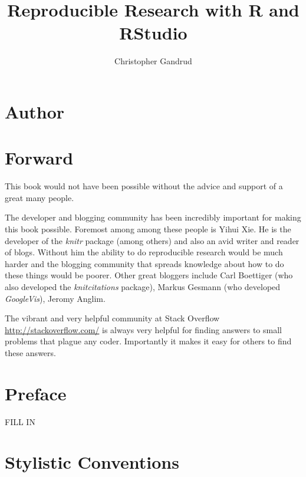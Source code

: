 \documentclass[ChapterTOCs,krantz1]{krantz}\usepackage{graphicx, color}
\begin{document}
\title{Reproducible Research with R and RStudio}

\author{Christopher Gandrud}

\maketitle

\frontmatter

{\chapter*{Author}}





\chapter*{Forward}

This book would not have been possible without the advice and support of a great many people.

The developer and blogging community has been incredibly important for making this book possible. Foremost among among these people is Yihui Xie. He is the developer of the {\emph{knitr}} package (among others) and also an avid writer and reader of blogs. Without him the ability to do reproducible research would be much harder and the blogging community that spreads knowledge about how to do these things would be poorer. Other great bloggers include Carl Boettiger (who also developed the {\emph{knitcitations}} package), Markus Gesmann (who developed {\emph{GoogleVis}}), Jeromy Anglim.

The vibrant and very helpful community at Stack Overflow \url{http://stackoverflow.com/} is always very helpful for finding answers to small problems that plague any coder. Importantly it makes it easy for others to find these answers.



\chapter*{Preface}

FILL IN


\chapter*{Stylistic Conventions}\label{StylisticConventions}
\begin{noindent}






\end{noindent}
\end{document}
